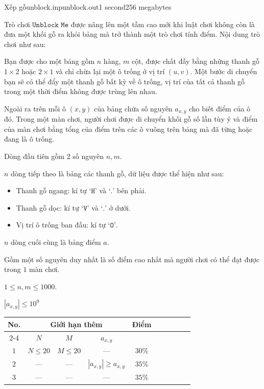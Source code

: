 \begin{problem}{Xếp gỗ}{unblock.inp}{unblock.out}{1 second}{256 megabytes}

Trò chơi $\texttt{Unblock Me}$ được nâng lên một tầm cao mới khi luật chơi không còn là đưa một khối gỗ ra khỏi bảng mà trở thành một trò chơi tính điểm. Nội dung trò chơi như sau:

Bạn được cho một bảng gồm $n$ hàng, $m$ cột, được chất đầy bằng những thanh gỗ $1 \times 2$ hoặc $2 \times 1$ và chỉ chừa lại một ô trống ở vị trí $(u, v)$. Một bước di chuyển bạn sẽ có thể đẩy một thanh gỗ bất kỳ về ô trống, vị trí của tất cả thanh gỗ trong một thời điểm không được trùng lên nhau.

Ngoài ra trên mỗi ô $(x, y)$ của bảng chứa số nguyên $a_{x,y}$ cho biết điểm của ô đó. Trong một màn chơi, người chơi được di chuyển khối gỗ số lần tùy ý và điểm của màn chơi bằng tổng của điểm trên các ô vuông trên bảng mà đã từng hoặc đang là ô trống.

\InputFile
Dòng đầu tiên gồm 2 số nguyên $n, m$.

$n$ dòng tiếp theo là bảng các thanh gỗ, dữ liệu được thể hiện như sau:
\begin{itemize}
\item Thanh gỗ ngang: kí tự $\texttt{`H'}$ và $\texttt{`.'}$ bên phải.

\item Thanh gỗ dọc: kí tự $\texttt{`V'}$ và $\texttt{`.'}$ ở dưới.

\item Vị trí ô trống ban đầu: kí tự $\texttt{`O'}$.
\end{itemize}
$n$ dòng cuối cùng là bảng điểm $a$.


\OutputFile
Gồm một số nguyên duy nhất là số điểm cao nhất mà người chơi có thể đạt được trong $1$ màn chơi.

\Constraints

$1 \le n, m \le 1000$.

$|a_{x,y}| \le 10^9$

\Subtask

\begin{center}
 \begin{tabular}{|c|c|c|c|c|c|c|c|c|c}
   \hline
    \multirow{2}{*}{\bf{No.}} &
    \multicolumn{3}{c|}{\bf{Giới hạn thêm}} &
    \multirow{2}{*}{\bf{Điểm}} \\ \cline{2-4}
      & $N$ & $M$ & $a_{x, y}$ & \\ \hline
      $1$ & $N \leq 20$ & $M \leq 20$ & --- & $30\%$ \\ \hline
      $2$ & --- & --- & $|a_{x, y}| \geq a_{x, y}$ & $35\%$ \\ \hline
      $3$ & --- & --- & --- & $35\%$ \\ \hline
 \end{tabular}
\end{center}


\end{problem}
